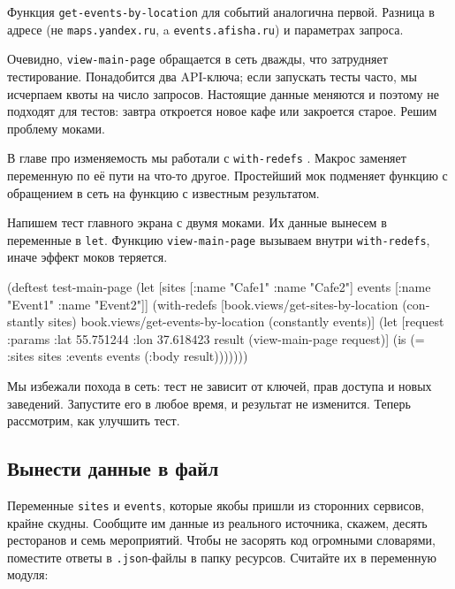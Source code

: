 Функция \verb|get-events-by-location| для событий аналогична первой. Разница в
адресе (не \verb|maps.yandex.ru|, a \verb|events.afisha.ru|) и параметрах
запроса.

Очевидно, \verb|view-main-page| обращается в сеть дважды, что затрудняет
тестирование. Понадобится два API-ключа; если запускать тесты часто, мы
исчерпаем квоты на число запросов. Настоящие данные меняются и поэтому не
подходят для тестов: завтра откроется новое кафе или закроется старое. Решим
проблему моками.


В главе про изменяемость мы работали с \verb|with-redefs| .
Макрос заменяет переменную по её пути на что-то другое. Простейший мок подменяет
функцию с обращением в сеть на функцию с известным результатом.

Напишем тест главного экрана с двумя моками. Их данные вынесем в переменные в
\verb|let|. Функцию \verb|view-main-page| вызываем  внутри
\verb|with-redefs|, иначе эффект моков теряется.

\begin{english}
  \begin{clojure}
(deftest test-main-page
  (let [sites [{:name "Cafe1"} {:name "Cafe2"}]
        events [{:name "Event1"} {:name "Event2"}]]
    (with-redefs
      [book.views/get-sites-by-location (constantly sites)
       book.views/get-events-by-location (constantly events)]
      (let [request {:params {:lat 55.751244
                              :lon 37.618423}}
            result (view-main-page request)]
        (is (= {:sites sites :events events}
               (:body result)))))))
  \end{clojure}
\end{english}

Мы избежали похода в сеть: тест не зависит от ключей, прав доступа и новых
заведений. Запустите его в любое время, и результат не изменится. Теперь
рассмотрим, как улучшить тест.

\subsection{Вынести данные в файл}

Переменные \verb|sites| и \verb|events|, которые якобы пришли из сторонних
сервисов, крайне скудны. Сообщите им данные из реального источника, скажем,
десять ресторанов и семь мероприятий. Чтобы не засорять код огромными словарями,
поместите ответы в \verb|.json|-файлы в папку ресурсов. Считайте их в переменную
модуля:

